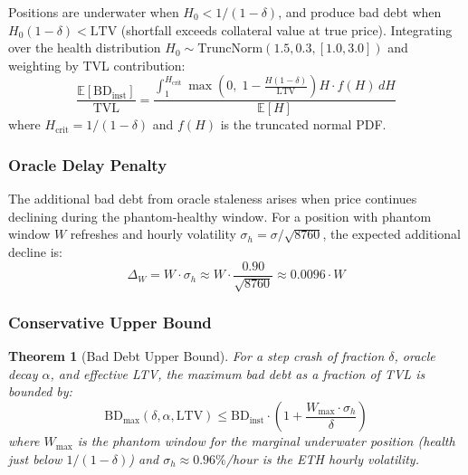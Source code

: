\documentclass[10pt,a4paper,twocolumn]{article}
\theoremstyle{definition}
\theoremstyle{plain}
\newtheorem{theorem}{Theorem}[section]
\theoremstyle{remark}
\begin{document}
Positions are underwater when $H_0 < 1/(1{-}\delta)$, and produce bad debt when $H_0(1{-}\delta) < \text{LTV}$ (shortfall exceeds collateral value at true price). Integrating over the health distribution $H_0 \sim \text{TruncNorm}(1.5, 0.3, [1.0, 3.0])$ and weighting by TVL contribution:
\begin{equation}
\label{eq:bd-instant}
\frac{\mathbb{E}[\text{BD}_{\text{inst}}]}{\text{TVL}} = \frac{\int_{1}^{H_{\text{crit}}} \max\!\left(0,\; 1 - \frac{H(1{-}\delta)}{\text{LTV}}\right) H \cdot f(H)\,dH}{\mathbb{E}[H]}
\end{equation}
where $H_{\text{crit}} = 1/(1{-}\delta)$ and $f(H)$ is the truncated normal PDF.

\subsubsection{Oracle Delay Penalty}
\label{subsec:bd-delay}

The additional bad debt from oracle staleness arises when price continues declining during the phantom-healthy window. For a position with phantom window $W$ refreshes and hourly volatility $\sigma_h = \sigma/\sqrt{8760}$, the expected additional decline is:
\begin{equation}
\label{eq:additional-decline}
\Delta_W = W \cdot \sigma_h \approx W \cdot \frac{0.90}{\sqrt{8760}} \approx 0.0096 \cdot W
\end{equation}

\subsubsection{Conservative Upper Bound}
\label{subsec:bd-conservative}

\begin{theorem}[Bad Debt Upper Bound]
\label{thm:bd-bound}
For a step crash of fraction $\delta$, oracle decay $\alpha$, and effective LTV, the maximum bad debt as a fraction of TVL is bounded by:
\begin{equation}
\label{eq:bd-bound}
\text{BD}_{\max}(\delta, \alpha, \text{LTV}) \leq \text{BD}_{\text{inst}} \cdot \left(1 + \frac{W_{\max} \cdot \sigma_h}{\delta}\right)
\end{equation}
where $W_{\max}$ is the phantom window for the marginal underwater position (health just below $1/(1{-}\delta)$) and $\sigma_h \approx 0.96\%$/hour is the ETH hourly volatility.
\end{theorem}
\end{document}
